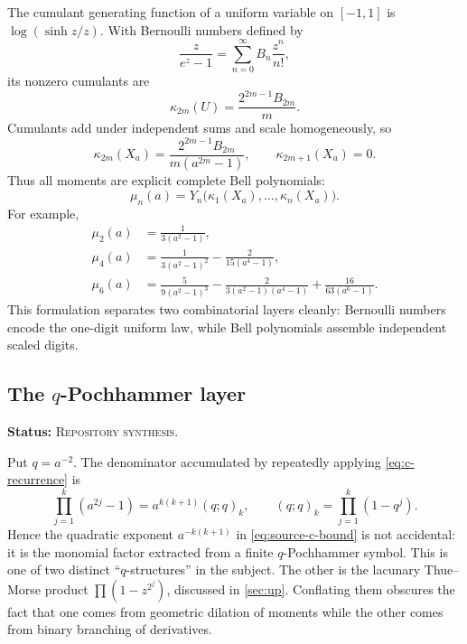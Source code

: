 \documentclass[11pt,oneside]{article}
\theoremstyle{definition}
\theoremstyle{remark}
\newcommand{\RepoStatus}{\textcolor{RepoOlive}{\textsc{Repository synthesis}}}
\newcommand{\status}[1]{\par\smallskip\noindent\textbf{Status:} #1.\par\smallskip}
\begin{document}
The cumulant generating function of a uniform variable on \([-1,1]\) is
\(\log(\sinh z/z)\).  With Bernoulli numbers defined by
\begin{equation}
  \frac{z}{e^z-1}=\sum_{n=0}^{\infty}B_n\frac{z^n}{n!},
  \label{eq:bernoulli-def}
\end{equation}
its nonzero cumulants are
\begin{equation}
  \kappa_{2m}(U)=\frac{2^{2m-1}B_{2m}}{m}.
  \label{eq:uniform-cumulants}
\end{equation}
Cumulants add under independent sums and scale homogeneously, so
\begin{equation}
  \boxed{\quad
  \kappa_{2m}(X_a)=
    \frac{2^{2m-1}B_{2m}}{m(a^{2m}-1)},
  \qquad \kappa_{2m+1}(X_a)=0.
  \quad}
  \label{eq:Xa-cumulants}
\end{equation}
Thus all moments are explicit complete Bell polynomials:
\begin{equation}
  \mu_n(a)=Y_n\bigl(\kappa_1(X_a),\ldots,\kappa_n(X_a)\bigr).
  \label{eq:bell-moments}
\end{equation}
For example,
\begin{align}
  \mu_2(a)&=\frac1{3(a^2-1)},
  \label{eq:mu2}\\
  \mu_4(a)&=\frac1{3(a^2-1)^2}-\frac{2}{15(a^4-1)},
  \label{eq:mu4}\\
  \mu_6(a)&=\frac{5}{9(a^2-1)^3}
    -\frac{2}{3(a^2-1)(a^4-1)}
    +\frac{16}{63(a^6-1)}.
  \label{eq:mu6}
\end{align}
This formulation separates two combinatorial layers cleanly: Bernoulli numbers encode the one-digit uniform law, while Bell polynomials assemble independent scaled digits.

\subsection{The \texorpdfstring{\(q\)}{q}-Pochhammer layer}
\status{\RepoStatus}

Put \(q=a^{-2}\).  The denominator accumulated by repeatedly applying \eqref{eq:c-recurrence} is
\begin{equation}
  \prod_{j=1}^{k}(a^{2j}-1)
   =a^{k(k+1)}(q;q)_k,
  \qquad (q;q)_k=\prod_{j=1}^{k}(1-q^j).
  \label{eq:qpoch-denominator}
\end{equation}
Hence the quadratic exponent \(a^{-k(k+1)}\) in \eqref{eq:source-c-bound} is not accidental: it is the monomial factor extracted from a finite \(q\)-Pochhammer symbol.  This is one of two distinct ``\(q\)-structures'' in the subject.  The other is the lacunary Thue--Morse product \(\prod(1-z^{2^j})\), discussed in \cref{sec:up}.  Conflating them obscures the fact that one comes from geometric dilation of moments while the other comes from binary branching of derivatives.
\end{document}
